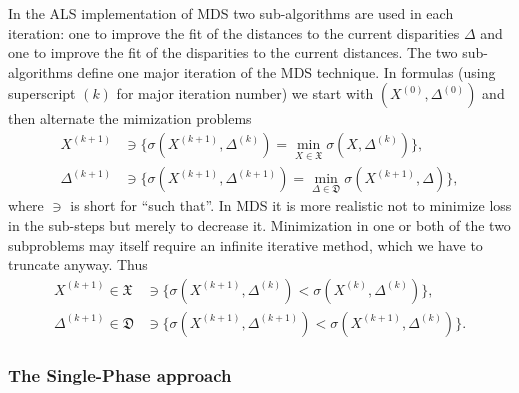 \documentclass[
  12pt,
]{article}
\begin{document}
In the ALS implementation of MDS two sub-algorithms are used in each iteration: one to improve the fit of the distances to the current disparities
\(\Delta\) and one to improve the fit of the disparities to the current distances.
The two sub-algorithms define one major iteration of the MDS technique. In formulas
(using superscript \((k)\) for major iteration number) we start with \((X^{(0)},\Delta^{(0)})\)
and then alternate the mimization problems
\begin{subequations}
\begin{align}
X^{(k+1)}&\ni\{\sigma(X^{(k+1)},\Delta^{(k)})=\min_{X\in\mathfrak{X}}\sigma(X,\Delta^{(k)})\},\\
\Delta^{(k+1)}&\ni\{\sigma(X^{(k+1)},\Delta^{(k+1)})=\min_{\Delta\in\mathfrak{D}}\sigma(X^{(k+1)},\Delta)\},
\end{align}
\end{subequations}
where \(\ni\) is short for ``such that''.
In MDS it is more realistic not to minimize loss in the sub-steps but merely to decrease it. Minimization in one or both of the two subproblems may itself require an infinite iterative method, which we have to truncate anyway. Thus
\begin{subequations}
\begin{align}
X^{(k+1)}\in\mathfrak{X}&\ni\{\sigma(X^{(k+1)},\Delta^{(k)})<\sigma(X^{(k)},\Delta^{(k)})\},\\
\Delta^{(k+1)}\in\mathfrak{D}&\ni\{\sigma(X^{(k+1)},\Delta^{(k+1)})<\sigma(X^{(k+1)},\Delta^{(k)})\}.
\end{align}
\end{subequations}

\subsubsection{The Single-Phase approach}\label{the-single-phase-approach}
\end{document}
